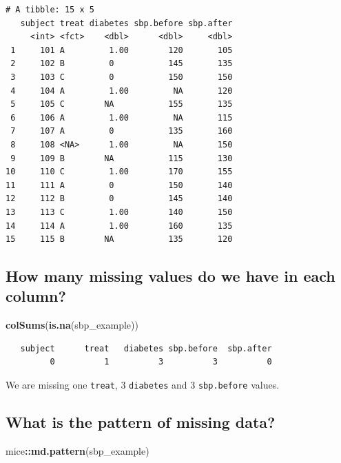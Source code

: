 \documentclass[]{book}
\newenvironment{Shaded}{\begin{snugshade}}{\end{snugshade}}
\newcommand{\KeywordTok}[1]{\textcolor[rgb]{0.13,0.29,0.53}{\textbf{#1}}}
\newcommand{\OperatorTok}[1]{\textcolor[rgb]{0.81,0.36,0.00}{\textbf{#1}}}
\newcommand{\NormalTok}[1]{#1}
\theoremstyle{definition}
\theoremstyle{definition}
\theoremstyle{definition}
\theoremstyle{remark}
\begin{document}
\begin{verbatim}
# A tibble: 15 x 5
   subject treat diabetes sbp.before sbp.after
     <int> <fct>    <dbl>      <dbl>     <dbl>
 1     101 A         1.00        120       105
 2     102 B         0           145       135
 3     103 C         0           150       150
 4     104 A         1.00         NA       120
 5     105 C        NA           155       135
 6     106 A         1.00         NA       115
 7     107 A         0           135       160
 8     108 <NA>      1.00         NA       150
 9     109 B        NA           115       130
10     110 C         1.00        170       155
11     111 A         0           150       140
12     112 B         0           145       140
13     113 C         1.00        140       150
14     114 A         1.00        160       135
15     115 B        NA           135       120
\end{verbatim}

\subsection{How many missing values do we have in each
column?}\label{how-many-missing-values-do-we-have-in-each-column}

\begin{Shaded}
\begin{Highlighting}[]
\KeywordTok{colSums}\NormalTok{(}\KeywordTok{is.na}\NormalTok{(sbp_example))}
\end{Highlighting}
\end{Shaded}

\begin{verbatim}
   subject      treat   diabetes sbp.before  sbp.after 
         0          1          3          3          0 
\end{verbatim}

We are missing one \texttt{treat}, 3 \texttt{diabetes} and 3
\texttt{sbp.before} values.

\subsection{What is the pattern of missing
data?}\label{what-is-the-pattern-of-missing-data}

\begin{Shaded}
\begin{Highlighting}[]
\NormalTok{mice}\OperatorTok{::}\KeywordTok{md.pattern}\NormalTok{(sbp_example)}
\end{Highlighting}
\end{Shaded}
\end{document}
